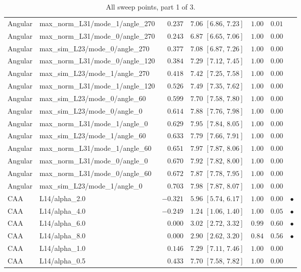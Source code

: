 \begin{table}[t]
\begin{tabular}{llrrrrc}
Angular & max\_norm\_L31/mode\_1/angle\_270 & $0.237$ & $7.06$ \scriptsize$[6.86,\,7.23]$ & $1.00$ & $0.01$ &  \\
Angular & max\_norm\_L31/mode\_0/angle\_270 & $0.243$ & $6.87$ \scriptsize$[6.65,\,7.06]$ & $1.00$ & $0.00$ &  \\
Angular & max\_sim\_L23/mode\_0/angle\_270 & $0.377$ & $7.08$ \scriptsize$[6.87,\,7.26]$ & $1.00$ & $0.00$ &  \\
Angular & max\_norm\_L31/mode\_0/angle\_120 & $0.384$ & $7.29$ \scriptsize$[7.12,\,7.45]$ & $1.00$ & $0.00$ &  \\
Angular & max\_sim\_L23/mode\_1/angle\_270 & $0.418$ & $7.42$ \scriptsize$[7.25,\,7.58]$ & $1.00$ & $0.00$ &  \\
Angular & max\_norm\_L31/mode\_1/angle\_120 & $0.526$ & $7.49$ \scriptsize$[7.35,\,7.62]$ & $1.00$ & $0.00$ &  \\
Angular & max\_sim\_L23/mode\_0/angle\_60 & $0.599$ & $7.70$ \scriptsize$[7.58,\,7.80]$ & $1.00$ & $0.00$ &  \\
Angular & max\_sim\_L23/mode\_0/angle\_0 & $0.614$ & $7.88$ \scriptsize$[7.76,\,7.98]$ & $1.00$ & $0.00$ &  \\
Angular & max\_norm\_L31/mode\_1/angle\_0 & $0.629$ & $7.95$ \scriptsize$[7.84,\,8.05]$ & $1.00$ & $0.00$ &  \\
Angular & max\_sim\_L23/mode\_1/angle\_60 & $0.633$ & $7.79$ \scriptsize$[7.66,\,7.91]$ & $1.00$ & $0.00$ &  \\
Angular & max\_norm\_L31/mode\_1/angle\_60 & $0.651$ & $7.97$ \scriptsize$[7.87,\,8.06]$ & $1.00$ & $0.00$ &  \\
Angular & max\_norm\_L31/mode\_0/angle\_0 & $0.670$ & $7.92$ \scriptsize$[7.82,\,8.00]$ & $1.00$ & $0.00$ &  \\
Angular & max\_norm\_L31/mode\_0/angle\_60 & $0.672$ & $7.87$ \scriptsize$[7.78,\,7.95]$ & $1.00$ & $0.00$ &  \\
Angular & max\_sim\_L23/mode\_1/angle\_0 & $0.703$ & $7.98$ \scriptsize$[7.87,\,8.07]$ & $1.00$ & $0.00$ &  \\
CAA & L14/alpha\_2.0 & $-0.321$ & $5.96$ \scriptsize$[5.74,\,6.17]$ & $1.00$ & $0.00$ & $\bullet$ \\
CAA & L14/alpha\_4.0 & $-0.249$ & $1.24$ \scriptsize$[1.06,\,1.40]$ & $1.00$ & $0.05$ & $\bullet$ \\
CAA & L14/alpha\_6.0 & $0.000$ & $3.02$ \scriptsize$[2.72,\,3.32]$ & $0.99$ & $0.60$ & $\bullet$ \\
CAA & L14/alpha\_8.0 & $0.000$ & $2.90$ \scriptsize$[2.62,\,3.20]$ & $0.84$ & $0.56$ & $\bullet$ \\
CAA & L14/alpha\_1.0 & $0.146$ & $7.29$ \scriptsize$[7.11,\,7.46]$ & $1.00$ & $0.00$ &  \\
CAA & L14/alpha\_0.5 & $0.433$ & $7.70$ \scriptsize$[7.58,\,7.82]$ & $1.00$ & $0.00$ &  \\
\bottomrule
\end{tabular}
\caption{All sweep points, part 1 of 3.}
\label{tab:allsweep1}
\end{table}

